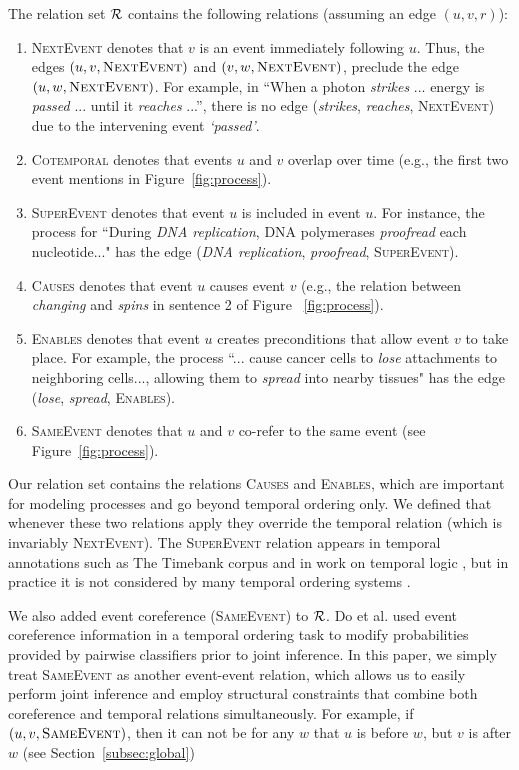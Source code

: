 The relation set $\mathcal{R}$ contains the following relations (assuming an edge $(u,v,r)$):
\begin{enumerate}[itemsep=0pt,topsep=0pt] 
\item \textsc{NextEvent} denotes that $v$ is an event immediately following $u$. Thus, the edges $(u,v,\mbox{\textsc{NextEvent}})$ and $(v,w,\mbox{\textsc{NextEvent}})$, preclude the edge $(u,w,\mbox{\textsc{NextEvent}})$. For example, in ``When a photon \emph{strikes} ... energy is  \emph{passed} ... until it \emph{reaches} ...'', there is no edge (\emph{strikes}, \emph{reaches}, \textsc{NextEvent}) due to the intervening event \emph{`passed'}.
\item \textsc{Cotemporal} denotes that events $u$ and $v$ overlap over time (e.g., the first two event mentions in Figure~\ref{fig:process}).
\item \textsc{SuperEvent} denotes that event $u$ is included in event $u$. For instance, the process for ``During \emph{DNA replication}, DNA polymerases \emph{proofread} each nucleotide..." has the edge (\emph{DNA replication}, \emph{proofread}, \textsc{SuperEvent}).
\item \textsc{Causes} denotes that event $u$ causes event $v$ (e.g., the relation between \emph{changing} and \emph{spins} in sentence 2 of Figure ~\ref{fig:process}).
\item \textsc{Enables} denotes that event $u$ creates preconditions that allow event $v$ to take place. For example, the process ``... cause cancer cells  to \emph{lose} attachments to neighboring cells..., allowing them to \emph{spread} into nearby tissues" has the edge (\emph{lose}, \emph{spread}, \textsc{Enables}).
\item \textsc{SameEvent} denotes that $u$ and $v$ co-refer to the same event (see Figure~\ref{fig:process}).
\end{enumerate}

Our relation set contains the relations \textsc{Causes} and \textsc{Enables}, which are important for modeling processes and go beyond temporal ordering only. We defined that whenever these two relations apply they override the temporal relation (which is invariably \textsc{NextEvent}). The \textsc{SuperEvent} relation appears in temporal annotations such as The Timebank corpus \cite{Pustejovsky03} and in work on temporal logic \cite{Allen83}, but in practice it is not considered by many temporal ordering systems \cite{Chambers08,Yoshikawa09,Do12}. 

We also added event coreference (\textsc{SameEvent}) to $\mathcal{R}$. Do et al.  used event coreference information in a temporal ordering task to modify probabilities provided by pairwise classifiers prior to joint inference. In this paper, we simply treat \textsc{SameEvent} as another event-event relation, which allows us to easily perform joint inference and employ structural constraints that combine both coreference and temporal relations simultaneously. For example, if $(u,v,\mbox{\textsc{SameEvent}})$, then it can not be for any $w$ that $u$ is before $w$, but $v$ is after $w$ (see Section~\ref{subsec:global})


